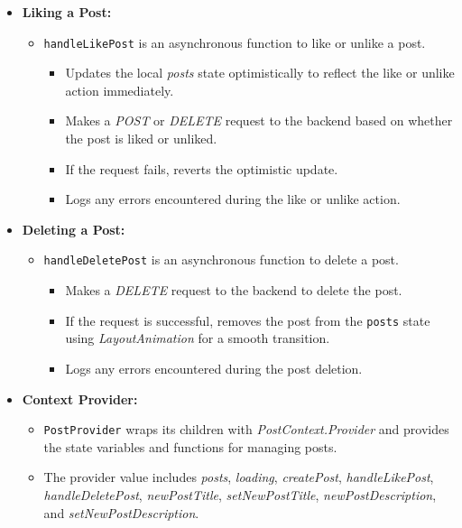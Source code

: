 \begin{itemize}
    \item \textbf{Liking a Post:}
    \begin{itemize}
        \item \texttt{handleLikePost} is an asynchronous function to like or unlike a post.
        \begin{itemize}
            \item Updates the local \textit{posts} state optimistically to reflect the like or unlike action immediately.
            \item Makes a \textit{POST} or \textit{DELETE} request to the backend based on whether the post is liked or unliked.
            \item If the request fails, reverts the optimistic update.
            \item Logs any errors encountered during the like or unlike action.
        \end{itemize}
    \end{itemize}

    \item \textbf{Deleting a Post:}
    \begin{itemize}
        \item \texttt{handleDeletePost} is an asynchronous function to delete a post.
        \begin{itemize}
            \item Makes a \textit{DELETE} request to the backend to delete the post.
            \item If the request is successful, removes the post from the \texttt{posts} state using \textit{LayoutAnimation} for a smooth transition.
            \item Logs any errors encountered during the post deletion.
        \end{itemize}
    \end{itemize}

    \item \textbf{Context Provider:}
    \begin{itemize}
        \item \texttt{PostProvider} wraps its children with \textit{PostContext.Provider} and provides the state variables and functions for managing posts.
        \item The provider value includes \textit{posts}, \textit{loading}, \textit{createPost}, \textit{handleLikePost}, \textit{handleDeletePost}, \textit{newPostTitle}, \textit{setNewPostTitle}, \textit{newPostDescription}, and \textit{setNewPostDescription}.
    \end{itemize}
\end{itemize}

